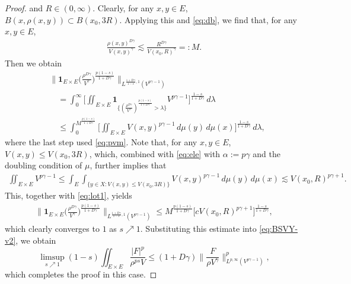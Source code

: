 \documentclass[10pt,a4paper]{amsart}
\newcommand{\BNorm}[2]{\Big\|#1\Big\|_{#2}}
\begin{document}
\begin{proof}
and $R\in(0,\infty)$. Clearly, for any $x,y\in E$, $B(x,\rho(x,y))\subset
B(x_0,3R)$. Applying this and \eqref{eq:db}, we find that, for any $x,y\in E$,
\begin{align}\label{eq:pvm}
\frac{\rho(x,y)^{D\gamma}}{V(x,y)^\gamma}\lesssim
\frac{R^{D\gamma}}{V(x_0,R)^\gamma}=:M.
\end{align}
Then we obtain
\begin{equation}\label{eq:lot1}
\begin{split}
&\BNorm{\mathbf{1}_{E\times
E}\Big(\frac{\rho^{D\gamma}}{V^\gamma}\Big)^{\frac{p(1-s)}{1+D\gamma}}}{
L^{\frac{1+D\gamma}{1-s},1} (V^{p\gamma-1})}\\
&\quad=\int_{0}^{\infty}\Big[\iint_{E\times E}
\mathbf{1}_{\{(\frac{\rho^{D\gamma}}{V^\gamma})^{\frac{p(1-s)}{1+D\gamma}}>\lambda
\}}V^{p\gamma-1}\Big]^{\frac{1-s}{1+D\gamma}}\,d\lambda\\
&\quad\le \int_{0}^{M^{\frac{p(1-s)}{1+D\gamma}}}
\Big[\iint_{E\times
E}V(x,y)^{p\gamma-1}\,d\mu(y)\,d\mu(x)\Big]^{\frac{1-s}{1+D\gamma}}\,d\lambda,
\end{split}
\end{equation}
where the last step used \eqref{eq:pvm}.
Note that, for any $x,y\in E$, $V(x,y)\le V(x_0,3R)$,
which, combined with \eqref{eq:ele} with $\alpha:=p\gamma$ and the
doubling condition of $\mu$, further implies that
\begin{align*}
\iint_{E\times E}V^{p\gamma-1}\le
\int_E \int_{\{y\in X:V(x,y)\le V(x_0,3R)\}}V(x,y)^{p\gamma-1}\,d\mu(y)\,d\mu(x)
\lesssim V(x_0,R)^{p\gamma+1}.
\end{align*}
This, together with \eqref{eq:lot1}, yields
\begin{align*}
\BNorm{\mathbf{1}_{E\times
E}\Big(\frac{\rho^{D\gamma}}{V^\gamma}\Big)^{\frac{p(1-s)}{1+D\gamma}}}{
L^{\frac{1+D\gamma}{1-s},1} (V^{p\gamma-1})}\le
M^{\frac{p(1-s)}{1+D\gamma}}\Big[cV(x_0,R)^{p\gamma+1}\Big]^{\frac{1-s}{1+D\gamma}},
\end{align*}
which clearly converges to $1$ as $s\nearrow 1$.
Substituting this estimate into \eqref{eq:BSVY-v2}, we obtain
\begin{equation*}
  \limsup_{s\nearrow 1}(1-s)\iint_{E\times E}
     \frac{|F|^p}{\rho^{ps}V}
   \leq(1+D\gamma)\BNorm{\frac{F}{\rho V^\gamma}}{
L^{p,\infty} (V^{p\gamma-1})}^p,
\end{equation*}
which completes the proof in this case.


\end{proof}
\end{document}
